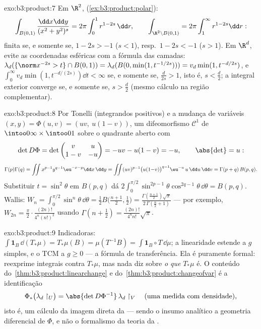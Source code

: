 \begin{solution}{exo:b3:product:7}
Em $\R^2$,  (\cref{ex:b3:product:polar}):
\[
\int_{B(0,1)}\frac{\dd x\dd y}{(x^2+y^2)^s}
= 2\pi\int_0^1 r^{1 - 2s}\,\dd r,
\qquad
\int_{\R^2\setminus B(0,1)} = 2\pi\int_1^\infty r^{1-2s}\dd r:
\]
finita se, e somente se, $1 - 2s > -1$ ($s < 1$), resp.\ $1 - 2s < -1$ ($s >
1$). Em $\R^d$, evite as coordenadas esféricas com a fórmula
das camadas: $\lambda_d(\{\norm x^{-2s} > t\}\cap B(0,1)) =
\lambda_d(B(0, \min(1, t^{-1/2s}))) = v_d\min(1, t^{-d/2s})$,
e $\int_0^\infty v_d\min(1, t^{-d/(2s)})\dd t < \infty$ se, e somente se,
$\frac d{2s} > 1$, isto é, $s < \frac d2$; a integral exterior
converge se, e somente se, $s > \frac d2$ (mesmo cálculo na região
complementar).
\end{solution}

\begin{solution}{exo:b3:product:8}
Por Tonelli (integrandos positivos) e a mudança de variáveis
$(x, y) = \Phi(u, v) = (uv,\ u(1-v))$, um difeomorfismo $\mathcal C^1$
de $\intoo0\infty\times\intoo01$ sobre o quadrante aberto com
\[
\det D\Phi = \det\begin{pmatrix} v & u\\ 1 - v & -u
\end{pmatrix} = -uv - u(1 - v) = -u,
\qquad \abs{\det} = u :
\]
\[
\Gamma(p)\Gamma(q) =
\iint x^{p-1}y^{q-1}\eu^{-x-y}\dd x\,\dd y
= \iint (uv)^{p-1}\bigl(u(1{-}v)\bigr)^{q-1}\eu^{-u}\,u\,
\dd u\,\dd v
= \Gamma(p + q)\,B(p, q).
\]
Substituir $t = \sin^2\theta$ em $B(p,q)$ dá
$2\int_0^{\pi/2}\sin^{2p-1}\theta\cos^{2q-1}\theta\,\dd\theta =
B(p, q)$. Wallis: $W_n =
\int_0^{\pi/2}\sin^n\theta\,\dd\theta = \frac12B\bigl(\frac{n +
1}2, \frac12\bigr) = \frac{\Gamma(\frac{n+1}2)\sqrt\pi}
{2\,\Gamma(\frac n2 + 1)}$ --- por exemplo, $W_{2n} =
\frac\pi2\cdot\frac{(2n)!}{4^n(n!)^2}$ usando
$\Gamma(n + \frac12) = \frac{(2n)!}{4^nn!}\sqrt\pi$.
\end{solution}

\begin{solution}{exo:b3:product:9}
Indicadoras: $\int\mathbf 1_B\,\dd(T_*\mu) = T_*\mu(B) =
\mu(T^{-1}B) = \int\mathbf 1_B\circ T\,\dd\mu$; a linearidade
estende a $g$ simples, e o TCM a $g \geq 0$ --- a fórmula de
transferência. Ela é puramente formal: reexprime integrais contra
$T_*\mu$, mas nada diz sobre \emph{o que} $T_*\mu$ é. O
conteúdo do~\cref{thm:b3:product:linearchange} e do~\cref{thm:b3:product:changeofvar} é a identificação
\[
\Phi_*\bigl(\lambda_d\restriction_U\bigr) =
\abs{\det D\Phi^{-1}}\,\lambda_d\restriction_V
\quad\text{(uma medida com densidade)},
\]
isto é, um cálculo da imagem direta da  ---
sendo o insumo analítico a geometria diferencial de $\Phi$,
e não o formalismo da teoria da .
\end{solution}

